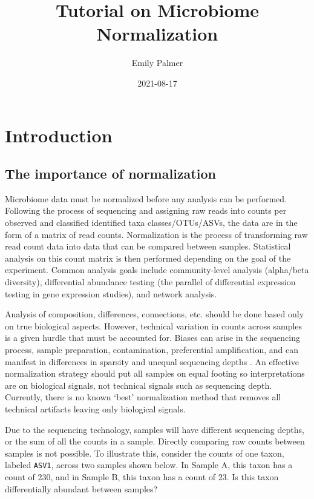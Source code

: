 \documentclass[
]{book}
\title{Tutorial on Microbiome Normalization}
\author{Emily Palmer}
\date{2021-08-17}
\begin{document}
\maketitle

{
\setcounter{tocdepth}{1}
\tableofcontents
}
\hypertarget{intro}{%
\chapter{Introduction}\label{intro}}

\hypertarget{the-importance-of-normalization}{%
\section{The importance of normalization}\label{the-importance-of-normalization}}

Microbiome data must be normalized before any analysis can be performed.
Following the process of sequencing and assigning raw reads into counts per observed and classified identified taxa classes/OTUs/ASVs, the data are in the form of a matrix of read counts. Normalization is the process of transforming raw read count data into data that can be compared between samples. Statistical analysis on this count matrix is then performed depending on the goal of the experiment. Common analysis goals include community-level analysis (alpha/beta diversity), differential abundance testing (the parallel of differential expression testing in gene expression studies), and network analysis.

Analysis of composition, differences, connections, etc. should be done based only on true biological aspects. However, technical variation in counts across samples is a given hurdle that must be accounted for. Biases can arise in the sequencing process, sample preparation, contamination, preferential amplification, and can manifest in differences in sparsity and unequal sequencing depths \citep{salter2014}. An effective normalization strategy should put all samples on equal footing so interpretations are on biological signals, not technical signals such as sequencing depth. Currently, there is no known `best' normalization method that removes all technical artifacts leaving only biological signals.

Due to the sequencing technology, samples will have different sequencing depths, or the sum of all the counts in a sample. Directly comparing raw counts between samples is not possible. To illustrate this, consider the counts of one taxon, labeled \texttt{ASV1}, across two samples shown below. In Sample A, this taxon has a count of 230, and in Sample B, this taxon has a count of 23. Is this taxon differentially abundant between samples?
\end{document}
